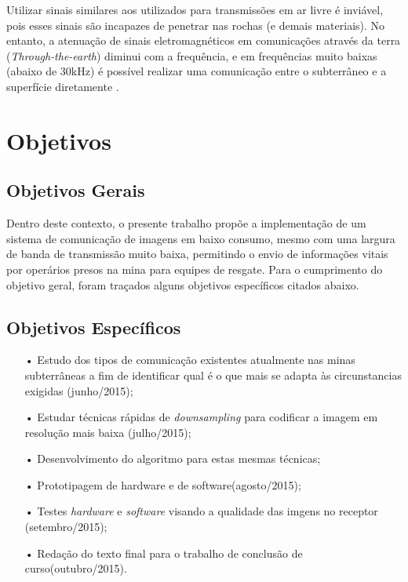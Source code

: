 \clearpage

Utilizar sinais similares aos utilizados para transmissões em ar livre é inviável, pois esses sinais são incapazes de penetrar nas rochas (e demais materiais). No entanto, a atenuação de sinais eletromagnéticos em comunicações através da terra (\textit{Through-the-earth}) diminui com a frequência, e em frequências muito baixas (abaixo de 30kHz) é possível realizar uma comunicação entre o subterrâneo e a superfície diretamente \cite{bandyopadhyay2010wireless}. 

\section{Objetivos}
\label{OBJETIVOS}
\subsection{Objetivos Gerais}

	Dentro deste contexto, o presente trabalho propõe a implementação de um sistema de comunicação de imagens em baixo consumo, mesmo com uma largura de banda de transmissão muito baixa, permitindo o envio de informações vitais por operários presos na mina para equipes de resgate. Para o cumprimento do objetivo geral, foram traçados alguns objetivos específicos citados abaixo.

\subsection{Objetivos Específicos}
\begin{itemize}
	\item[•] Estudo dos tipos de comunicação existentes atualmente nas minas subterrâneas a fim de identificar qual é o que mais se adapta às circunstancias exigidas (junho/2015);
	\item[•] Estudar técnicas rápidas de \textit{downsampling} para codificar a imagem em resolução mais baixa (julho/2015);
	\item[•] Desenvolvimento do algoritmo para estas mesmas técnicas;
	\item[•] Prototipagem de hardware e de software(agosto/2015);
	\item[•] Testes \textit{hardware} e \textit{software} visando a qualidade das imgens no receptor (setembro/2015);
	\item[•] Redação do texto final para o trabalho de conclusão de curso(outubro/2015).
\end{itemize}